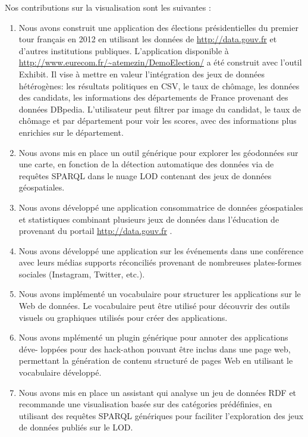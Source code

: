 Nos contributions sur la visualisation sont les suivantes :
\begin{enumerate}
 \item Nous avons construit une application des \'{e}lections pr\'{e}sidentielles du premier tour français en 2012 en utilisant les donn\'{e}es de \url{http://data.gouv.fr} et d'autres institutions publiques. L'application disponible à \url{http://www.eurecom.fr/~atemezin/DemoElection/} a \'{e}t\'{e} construit avec l'outil Exhibit. Il vise à mettre en valeur l'int\'{e}gration des jeux de donn\'{e}es h\'{e}t\'{e}rog\`{e}nes: les r\'{e}sultats politiques en CSV, le taux de chômage, les donn\'{e}es des candidats, les informations des d\'{e}partements de France provenant des donn\'{e}es DBpedia. L'utilisateur peut filtrer par image du candidat, le taux de chômage et par d\'{e}partement pour voir les scores, avec des informations plus enrichies sur le d\'{e}partement.
 \item Nous avons mis en place un outil g\'{e}n\'{e}rique pour explorer les g\'{e}odonn\'{e}es sur une carte, en fonction de la d\'{e}tection automatique des donn\'{e}es via de requ\^{e}tes SPARQL dans le nuage LOD contenant des jeux de donn\'{e}es g\'{e}ospatiales.
 \item Nous avons d\'{e}velopp\'{e} une application consommatrice de donn\'{e}es g\'{e}ospatiales et statistiques combinant plusieurs jeux de donn\'{e}es dans l'\'{e}ducation de provenant du portail \url{http://data.gouv.fr} .
 \item Nous avons d\'{e}velopp\'{e} une application sur les \'{e}v\'{e}nements dans une conf\'{e}rence avec leurs m\'{e}dias supports r\'{e}concili\'{e}s provenant de nombreuses plates-formes sociales (Instagram, Twitter, etc.).
 \item Nous avons impl\'{e}ment\'{e} un vocabulaire pour structurer les applications sur le Web de donn\'{e}es. Le vocabulaire peut \^{e}tre utilis\'{e} pour d\'{e}couvrir des outils visuels ou graphiques utilis\'{e}s pour cr\'{e}er des applications.
 \item Nous avons mpl\'{e}ment\'{e} un plugin g\'{e}n\'{e}rique pour annoter des applications d\'{e}ve- lopp\'{e}es pour des hack-athon pouvant \^{e}tre inclus dans une page web, permettant la g\'{e}n\'{e}ration de contenu structur\'{e} de pages Web en utilisant le vocabulaire d\'{e}velopp\'{e}.
 \item Nous avons mis en place un assistant qui analyse un jeu de donn\'{e}es RDF et  recommande une visualisation bas\'{e}e sur des cat\'{e}gories pr\'{e}d\'{e}finies, en utilisant des requ\^{e}tes SPARQL g\'{e}n\'{e}riques pour faciliter l'exploration des jeux de donn\'{e}es publi\'{e}s sur le LOD.
\end{enumerate}


